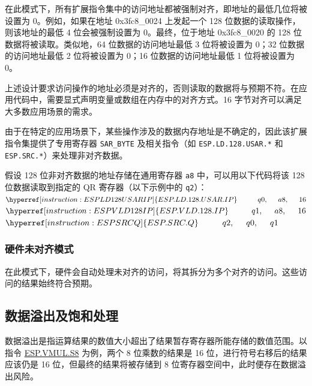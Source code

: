 \documentclass[main\_\_CN.tex]{subfiles}
\begin{document}
在此模式下，所有扩展指令集中的访问地址都被强制对齐，即地址的最低几位将被设置为 0。例如，如果在地址 0x3fc8\_0024 上发起一个 128 位数据的读取操作，则该地址的最低 4 位会被强制设置为 0。最终，位于地址 0x3fc8\_0020 的 128 位数据将被读取。类似地，64 位数据的访问地址最低 3 位将被设置为 0；32 位数据的访问地址最低 2 位将被设置为 0；16 位数据的访问地址最低 1 位将被设置为 0。

上述设计要求访问操作的地址必须是对齐的，否则读取的数据将与预期不符。在应用代码中，需要显式声明变量或数组在内存中的对齐方式。16 字节对齐可以满足大多数应用场景的需求。


由于在特定的应用场景下，某些操作涉及的数据内存地址是不确定的，因此该扩展指令集提供了专用寄存器 \texttt{SAR\_BYTE} 及相关指令（如 \texttt{ESP.LD.128.USAR.*} 和 \texttt{ESP.SRC.*}）来处理非对齐数据。

假设 128 位非对齐数据的地址存储在通用寄存器 \texttt{a8} 中，可以用以下代码将该 128 位数据读取到指定的 QR 寄存器（以下示例中的 \texttt{q2}）：\\
$ \hyperref[instruction:ESPLD128USARIP]{ESP.LD.128.USAR.IP}\hspace{1cm}q0,\hspace{0.5cm}a8,\hspace{0.5cm}16 $ \\
$ \hyperref[instruction:ESPVLD128IP]{ESP.VLD.128.IP}\hspace{1cm}q1,\hspace{0.5cm}a8,\hspace{0.5cm}16 $ \\
$ \hyperref[instruction:ESPSRCQ]{ESP.SRC.Q}\hspace{1cm}q2,\hspace{0.5cm}q0,\hspace{0.5cm}q1 $

\subsubsection{硬件未对齐模式}

在此模式下，硬件会自动处理未对齐的访问，将其拆分为多个对齐的访问。这些访问的结果始终符合预期。

\subsection{数据溢出及饱和处理}

数据溢出是指运算结果的数值大小超出了结果暂存寄存器所能存储的数值范围。以指令 \hyperref[instruction:ESPVMULS8]{ESP.VMUL.S8} 为例，两个 8 位乘数的结果是 16 位，进行符号右移后的结果应该仍是 16 位，但最终的结果将被存储到 8 位寄存器空间中，此时便存在数据溢出风险。
\end{document}
